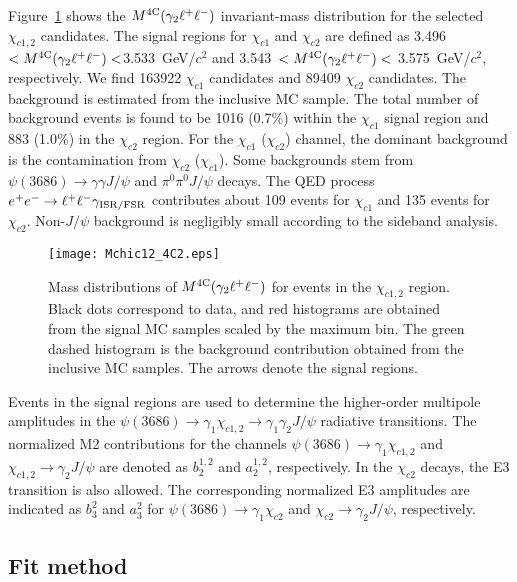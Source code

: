 \documentclass[prd,twocolumn,showpacs,amsmath,amssymb]{revtex4-1}
\begin{document}
Figure~\ref{chicj_dis} shows the $M^{4\rm C}(\gamma_{2}\ell^{+}\ell^{-})$ invariant-mass distribution for the selected $\chi_{c1,2}$ candidates.
The signal regions for $\chi_{c1}$ and $\chi_{c2}$ are defined as 3.496~$ < M^{4\rm C}(\gamma_{2}\ell^+\ell^-) < $3.533~GeV/$c^2$ and
3.543~$ < M^{4\rm C}(\gamma_{2}\ell^+\ell^-) <$ 3.575~GeV/$c^2$, respectively. We find 163922 $\chi_{c1}$ candidates and 89409 $\chi_{c2}$ candidates. The background is estimated from the inclusive MC sample.  The total number of background events is found to be 1016 (0.7\%)
within the $\chi_{c1}$ signal region and 883 (1.0\%) in the $\chi_{c2}$ region. For the $\chi_{c1}$ ($\chi_{c2}$) channel, the dominant background
is the contamination from $\chi_{c2}$ ($\chi_{c1}$). Some backgrounds stem from $\psi(3686)\rightarrow\gamma\gamma J/\psi$ and $\pi^{0}\pi^{0}J/\psi$ decays. The QED process $e^+e^-\to \ell^+\ell^-\gamma_{\rm ISR/FSR}$ contributes about 109 events for $\chi_{c1}$ and 135 events for $\chi_{c2}$. Non-$J/\psi$ background is negligibly small according to the sideband analysis.

\begin{figure}
  \centering
    \texttt{[image: Mchic12\_4C2.eps]}
   \caption{Mass distributions of $M^{\rm 4C}(\gamma_2 \ell^+\ell^-)$ for events in the $\chi_{c1,2}$ region. Black dots correspond to data, and
red histograms are obtained from the signal MC samples scaled by the maximum bin. The green dashed histogram is the background contribution obtained from the inclusive MC samples.
The arrows denote the signal regions.}
  \label{chicj_dis} %
\end{figure}

Events in the signal regions are used to determine the higher-order multipole amplitudes in the $\psi(3686)\rightarrow\gamma_{1}\chi_{c1,2}\rightarrow\gamma_1\gamma_{2}J/\psi$ radiative transitions.
The normalized M2 contributions for the channels $\psi(3686)\rightarrow\gamma_{1}\chi_{c1,2}$ and $\chi_{c1,2}\rightarrow\gamma_{2}J/\psi$ are denoted
as $b_{2}^{1,2}$ and $a_{2}^{1,2}$, respectively. In the $\chi_{c2}$ decays, the E3 transition is also allowed. The corresponding normalized E3 amplitudes are indicated
as $b^{2}_{3}$ and $a^{2}_{3}$ for $\psi(3686)\rightarrow\gamma_{1}\chi_{c2}$ and $\chi_{c2}\rightarrow\gamma_{2}J/\psi$, respectively.

\subsection{Fit method}
\end{document}
